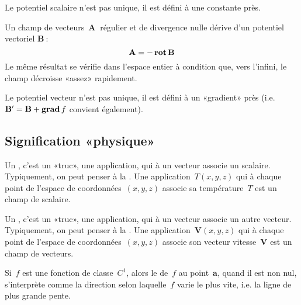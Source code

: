 Le potentiel scalaire n'est pas unique, il est défini à une constante près.

\medskip
Un champ de vecteurs~$\mathbf{A}~$ régulier et de divergence nulle dérive d'un potentiel vectoriel
$\mathbf{B}~$:
\begin{equation}
  \mathbf{A} = -\operatorname{\mathbf{rot}} \mathbf{B}
\end{equation}
Le même résultat se vérifie dans l'espace entier à condition que, vers l'infini, le champ
décroisse «assez» rapidement.

Le potentiel vecteur n'est pas unique, il est défini à un «gradient» près (i.e.
$ \mathbf{B} ' = \mathbf{B} + \operatorname{\mathbf{grad}} f$ convient
également).

\medskip
\subsection{Signification «physique»}

Un , c'est un «truc», une application, qui à un vecteur
associe un scalaire. Typiquement, on peut penser à la .
Une application~$T(x,y,z)$ qui à chaque point de l'espace de coordonnées~$(x,y,z)$ associe
sa température~$T$ est un champ de scalaire.

Un , c'est un «truc», une application, qui à un vecteur
associe un autre vecteur. Typiquement, on peut penser à la .
Une application~$\mathbf{V}(x,y,z)$ qui à chaque point de l'espace de coordonnées~$(x,y,z)$
associe son vecteur vitesse~$\mathbf{V}$ est un champ de vecteurs.

\medskip
Si~$f$ est une fonction de classe~$C^1$, alors le  de~$f$ au point~$\mathbf{a}$,
quand il est non nul, s'interprète comme la direction selon laquelle~$f$ varie le plus vite,
i.e. la ligne de plus grande pente.

